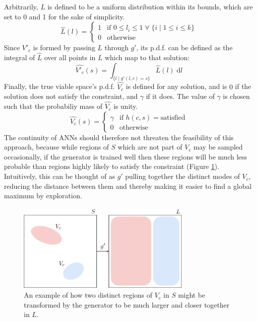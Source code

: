 \documentclass[../../main.tex]{subfiles}
\begin{document}
Arbitrarily, $L$ is defined to be a uniform distribution within its bounds, which are set to 0 and 1 for the sake of simplicity.
\begin{equation}
	\hat{L}(l)=\left\{\begin{array}{ll}1&\mbox{if }0\le l_i\le1\;\forall\;\{i\;|\;1\le i\le k\}\\0&\mbox{otherwise}\end{array}\right.
\end{equation}
Since $V'_c$ is formed by passing $L$ through $g'$, its p.d.f. can be defined as the integral of $\hat{L}$ over all points in $L$ which map to that solution:
\begin{equation}
	\hat{V'_c}(s)=\int_{\{l\;|\;g'(l,c)=s\}}\hat{L}(l)\;\mathrm{d}l
\end{equation}
Finally, the true viable space's p.d.f. $\hat{V_c}$ is defined for any solution, and is $0$ if the solution does not satisfy the constraint, and $\gamma$ if it does.
The value of $\gamma$ is chosen such that the probabiliy mass of $\hat{V_c}$ is unity.
\begin{equation}
	\hat{V_c}(s)=\left\{\begin{array}{ll}\gamma&\mbox{if }h(c,s)=\text{satisfied}\\0&\mbox{otherwise}\end{array}\right.
\end{equation}
The continuity of ANNs should therefore not threaten the feasibility of this approach, because while regions of $S$ which are not part of $V_c$ may be sampled occasionally, if the generator is trained well then these regions will be much less probable than regions highly likely to satisfy the constraint (Figure \ref{fig:exampleMapping}).
Intuitively, this can be thought of as $g'$ pulling together the distinct modes of $V_c$, reducing the distance between them and thereby making it easier to find a global maximum by exploration.
\begin{figure}[H]
    \begin{center}
    \includegraphics[width=0.75\textwidth]{exampleMapping}
    \caption[Viable space transformation]{
		An example of how two distinct regions of $V_c$ in $S$ might be transformed by the generator to be much larger and closer together in $L$. 
    }
    \label{fig:exampleMapping}
    \end{center}
\end{figure}
\end{document}

